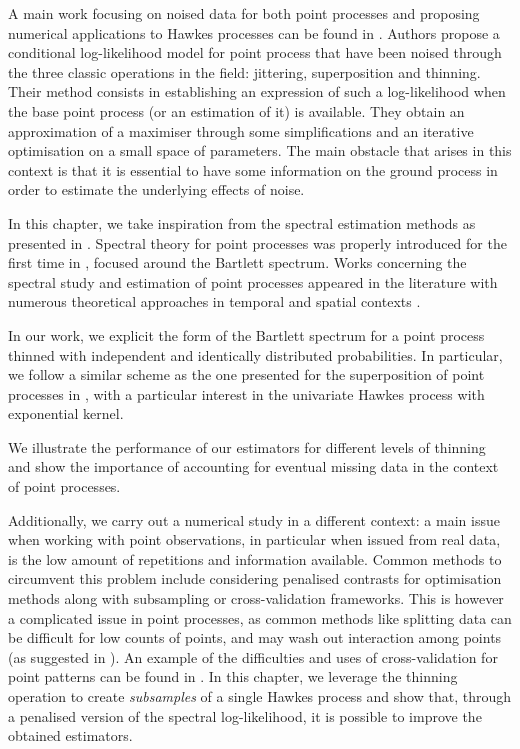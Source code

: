 A main work focusing on noised data for both point processes and proposing numerical applications to Hawkes processes can be found in \textcite{Lund2000}. 
Authors propose a conditional log-likelihood model for point process that have been noised through the three classic operations in the field: jittering, superposition and thinning. 
Their method consists in establishing an expression of such a log-likelihood when the base point process (or an estimation of it) is available.
They obtain an approximation of a maximiser through some simplifications and an iterative optimisation on a small space of parameters.
The main obstacle that arises in this context is that it is essential to have some information on the ground process in order to estimate the underlying effects of noise.

In this chapter, we take inspiration from the spectral estimation methods as presented in \textcite{Cheysson2022, Bonnet2024}.
Spectral theory for point processes was properly introduced for the first time in \textcite{Bartlett1963},
focused around the Bartlett spectrum. 
Works concerning the spectral study and estimation of point processes appeared in the literature with numerous theoretical approaches in temporal and spatial contexts \textcite{Daley1971, Tuan1981, Mugglestone2001, Rajala2023}.

In our work, we explicit the form of the Bartlett spectrum for a point process thinned with independent and identically distributed probabilities. In particular, we follow a similar scheme as the one presented for the superposition of point processes in \textcite{Bonnet2024}, with a particular interest in the univariate Hawkes process with exponential kernel.

We illustrate the performance of our estimators for different levels of thinning and show the importance of accounting for eventual missing data in the context of point processes.

Additionally, we carry out a numerical study in a different context:
a main issue when working with point observations, in particular when issued from real data, is the low amount of repetitions and information available.
Common methods to circumvent this problem include considering penalised contrasts for optimisation methods along with subsampling or cross-validation frameworks. 
This is however a complicated issue in point processes, as common methods like splitting data can be difficult for low counts of points, and may wash out interaction among points (as suggested in \textcite{Reynaud2014}).
An example of the difficulties and uses of cross-validation for point patterns can be found in \textcite{Cronie2023}.
In this chapter, we leverage the thinning operation to create \textit{subsamples} of a single Hawkes process
and show that, through a penalised version of the spectral log-likelihood, 
it is possible to improve the obtained estimators.


